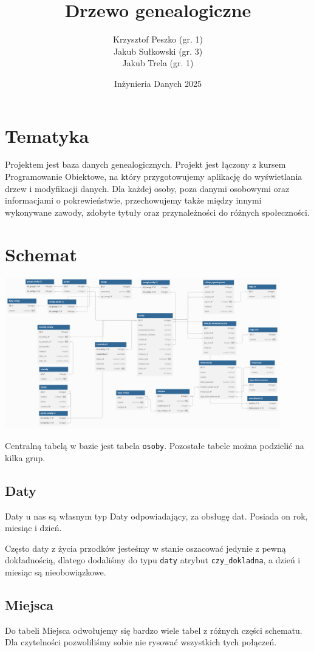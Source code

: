 \documentclass{article}
\title{Drzewo genealogiczne}
\author{Krzysztof Peszko (gr. 1) \\
Jakub Sułkowski (gr. 3) \\ Jakub Trela (gr. 1)}
\date{Inżynieria Danych 2025}
\begin{document}
\maketitle

\section{Tematyka}
Projektem jest baza danych genealogicznych. Projekt jest łączony z kursem Programowanie Obiektowe, na który przygotowujemy aplikację do wyświetlania drzew i modyfikacji danych. Dla każdej osoby, poza danymi osobowymi oraz informacjami o pokrewieństwie, przechowujemy także między innymi wykonywane zawody, zdobyte tytuły oraz przynależności do różnych społeczności.

\section{Schemat}
\begin{center}
    \includegraphics[width=0.9\textwidth]{img/Database_plan_final.png}
\end{center}
Centralną tabelą w bazie jest tabela \texttt{osoby}. Pozostałe tabele można podzielić na kilka grup.

\subsection{Daty}
Daty u nas są własnym typ Daty odpowiadający, za obsługę dat. Posiada on rok, miesiąc i dzień. 

Często daty z życia przodków jesteśmy w stanie oszacować jedynie z pewną dokładnością, dlatego dodaliśmy do typu \texttt{daty} atrybut \texttt{czy\_dokladna}, a dzień i miesiąc są nieobowiązkowe.

\subsection{Miejsca}
Do tabeli Miejsca odwołujemy się bardzo wiele tabel z różnych części schematu. Dla czytelności pozwoliliśmy sobie nie rysować wszystkich tych połączeń.
\end{document}
